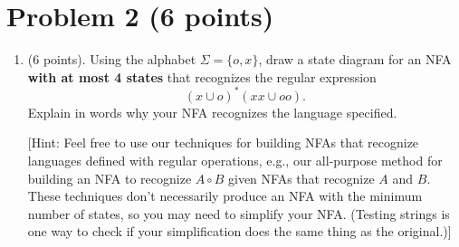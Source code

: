 \documentclass{../homework}
\begin{document}




\clearpage
\section{Problem 2 (6 points)}

\begin{enumerate}
    \item (6 points). Using the alphabet $\Sigma = \{o, x\}$, draw a state diagram for an NFA \textbf{with at most 4 states} that recognizes the regular expression
    \[
            (x \cup o)^*(xx \cup oo).
    \]
    Explain in words why your NFA recognizes the language specified.
        
    [Hint: Feel free to use our techniques for building NFAs that recognize languages defined with regular operations, e.g., our all-purpose method for building an NFA to recognize $A \circ B$ given NFAs that recognize $A$ and $B$. These techniques don't necessarily produce an NFA with the minimum number of states, so you may need to simplify your NFA. (Testing strings is one way to check if your simplification does the same thing as the original.)]
    

    
\end{enumerate}

\clearpage
\end{document}
